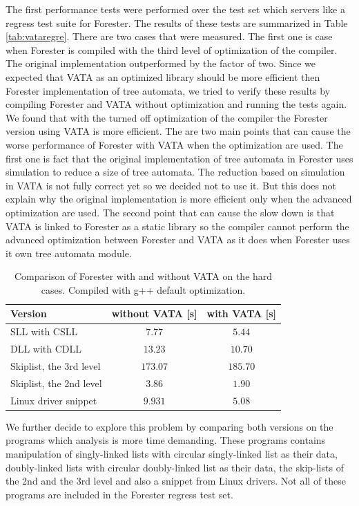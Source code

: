 The first performance tests were performed over the test set
which servers like a regress test suite for Forester.
The results of these tests are summarized in Table \ref{tab:vataregre}.
There are two cases that were measured.
The first one is case when Forester is compiled with the third level of optimization of the compiler.
The original implementation outperformed by the factor of two.
Since we expected that VATA as an optimized library should be more efficient
then Forester implementation of tree automata, we tried to verify these results
by compiling Forester and VATA without optimization and running the tests again.
We found that with the turned off optimization of the compiler
the Forester version using VATA is more efficient.
The are two main points that can cause the worse performance of Forester with VATA
when the optimization are used.
The first one is fact that the original implementation of tree automata
in Forester uses simulation to reduce a size of tree automata.
The reduction based on simulation in VATA is not fully correct yet
so we decided not to use it.
But this does not explain why the original implementation is more efficient
only when the advanced optimization are used.
The second point that can cause the slow down is
that VATA is linked to Forester as a static library so the compiler cannot
perform the advanced optimization between Forester and VATA as it does
when Forester uses it own tree automata module.


\begin{table}[bt]
	\vskip6pt
	\caption{Comparison of Forester with and without VATA on the hard cases.
		Compiled with g++ default optimization.
	}
	\centering
	\begin{tabular}{|l | c | c |}
		\hline
		Version & without VATA [s] & with VATA [s] \\
		\hline
		\hline
		SLL with CSLL            & $7.77$ & $5.44$ \\
		\hline
		DLL with CDLL            & $13.23$ & $10.70$ \\
		\hline
		Skiplist, the 3rd level  & $173.07$ & $185.70$ \\
		\hline
		Skiplist, the 2nd level  & $3.86$ & $1.90$ \\
		\hline
		Linux driver snippet     & $9.931$ & $5.08$  \\ 
		\hline
	\end{tabular}
	\label{tab:vatadef}
\end{table}

We further decide to explore this problem by comparing
both versions on the programs which analysis is more time demanding.
These programs contains manipulation of singly-linked lists with
circular singly-linked list as their data, doubly-linked lists with
circular doubly-linked list as their data, the skip-lists of the 2nd and
the 3rd level and also a snippet from Linux drivers.
Not all of these programs are included in the Forester regress test set.

